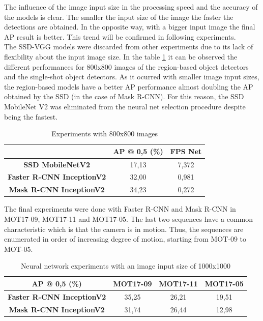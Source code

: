 The influence of the image input size in the processing speed and the accuracy of the models is clear. The smaller the input size of the image the faster the detections are obtained. In the opposite way, with a bigger input image the final AP result is better. This trend will be confirmed in following experiments.\\

The SSD-VGG models were discarded from other experiments due to its lack of flexibility about the input image size. In the table \ref{tab:net_exp_3}  it can be observed the different performances for 800x800 images of the region-based object detectors and the single-shot object detectors. As it ocurred with smaller image input sizes, the region-based models have a better AP performance almost doubling the AP obtained by the SSD (in the case of Mask R-CNN). For this reason, the SSD MobileNet V2 was eliminated from the neural net selection procedure despite being the fastest. 
\begin{table}[H]
\scriptsize
\begin{center}
\begin{tabular}{|c|c|c|}
\hline
\textbf{}                         & \textbf{AP @ 0,5 (\%)} & \textbf{FPS Net} \\ \hline
\textbf{SSD MobileNetV2}          & 17,13                  & 7,372             \\ \hline
\textbf{Faster R-CNN InceptionV2} & 32,00                  & 0,981            \\ \hline
\textbf{Mask R-CNN InceptionV2}   & 34,23                  & 0,272            \\ \hline
\end{tabular}
\end{center}
\caption{Experiments with 800x800 images}
\label{tab:net_exp_3}
\end{table}
The final experiments were done with Faster R-CNN and Mask R-CNN in MOT17-09, MOT17-11 and MOT17-05. The last two sequences have a common characteristic which is that the camera is in motion. Thus, the sequences are enumerated in order of increasing degree of motion, starting from MOT-09 to MOT-05.
\begin{table}[H]
\scriptsize
\begin{center}
\begin{tabular}{|c|c|c|c|}
\hline
\textbf{AP @ 0,5 (\%)}            & \textbf{MOT17-09} & \textbf{MOT17-11} & \multicolumn{1}{l|}{\textbf{MOT17-05}} \\ \hline
\textbf{Faster R-CNN InceptionV2} & 35,25             & 26,21             & 19,51                                  \\ \hline
\textbf{Mask R-CNN InceptionV2}   & 31,74             & 26,44             & 12,98                                  \\ \hline
\end{tabular}
\end{center}
\caption{Neural network experiments with an image input size of 1000x1000}
\label{tab:net_exp_4}
\end{table}
